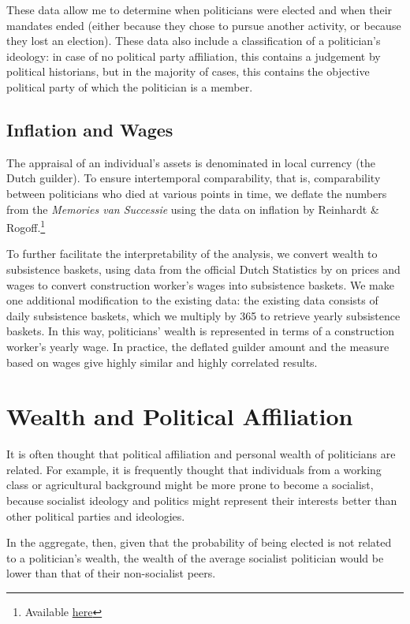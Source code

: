 These data allow me to determine when politicians were elected and when their mandates ended (either because they chose to pursue another activity, or because they lost an election). These data also include a classification of a politician's ideology: in case of no political party affiliation, this contains a judgement by political historians, but in the majority of cases, this contains the objective political party of which the politician is a member. 

\subsection{Inflation and Wages}
The appraisal of an individual's assets is denominated in local currency (the Dutch guilder). To ensure intertemporal comparability, that is, comparability between politicians who died at various points in time, we deflate the numbers from the \textit{Memories van Successie} using the data on inflation by Reinhardt \& Rogoff.\footnote{Available \href{https://carmenreinhart.com/2020/02/netherlands/}{here}}

To further facilitate the interpretability of the analysis, we convert wealth to subsistence baskets, using data from the official Dutch Statistics by \autocite{deZwart2015} on prices and wages to convert construction worker's wages into subsistence baskets. We make one additional modification to the existing data: the existing data consists of daily subsistence baskets, which we multiply by 365 to retrieve yearly subsistence baskets. In this way, politicians' wealth is represented in terms of a construction worker's yearly wage. In practice, the deflated guilder amount and the measure based on wages give highly similar and highly correlated results. 

\section{Wealth and Political Affiliation}
It is often thought that political affiliation and personal wealth of politicians are related. For example, it is frequently thought that individuals from a working class or agricultural background might be more prone to become a socialist, because socialist ideology and politics might represent their interests better than other political parties and ideologies. 

In the aggregate, then, given that the probability of being elected is not related to a politician's wealth, the wealth of the average socialist politician would be lower than that of their non-socialist peers. 

